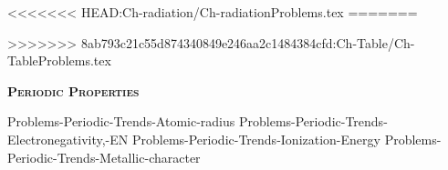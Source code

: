 \documentclass[main.tex]{subfiles}
\newcommand\chapterlabel{Ch-Table}
\begin{document}
\begin{multicols*}{2}
{<<<<<<< HEAD:Ch-radiation/Ch-radiationProblems.tex
=======

>>>>>>> 8ab793c21c55d874340849e246aa2c1484384cfd:Ch-Table/Ch-TableProblems.tex
{\raggedright\textsc{\textbf{Periodic Properties }}\par}
  {Problems-Periodic-Trends-Atomic-radius}
  {Problems-Periodic-Trends-Electronegativity,-EN}
  {Problems-Periodic-Trends-Ionization-Energy}
  {Problems-Periodic-Trends-Metallic-character}
\renewcommand\chapterlabel{Ch-Table}
}{}

\end{multicols*} \iftoggle{showfinalanswers}{
\newpage\fancyhfoffset[E,O]{0pt}
\begin{answerbox}
\begin{answersenvironment}
 \begin{localsize}{10}
{ \checkoddpage\ifoddpage    \else   \clearpage\thispagestyle{empty}\mbox{}\clearpage\fi
\Large \bf Answers}
\SetupExSheets{ headings = inline-nr , counter-format = qu) ,}
\printsolutions 
  \vspace{20cm}
 \end{localsize}
 \end{answersenvironment}
\end{answerbox}
}{}
\checkoddpage\ifoddpage   \clearpage\thispagestyle{empty}\mbox{}\clearpage \else   \fi
\end{document}
